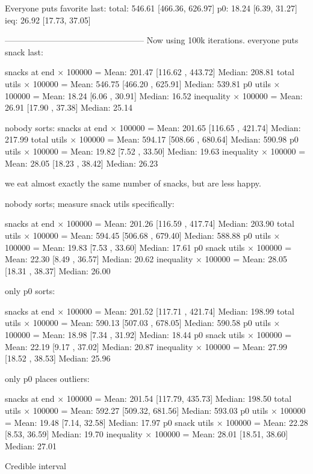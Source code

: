 \documentclass[twocolumn]{article}
\begin{document}
Everyone puts favorite last:
total: 546.61 [466.36, 626.97]
p0: 18.24 [6.39, 31.27]
ieq: 26.92 [17.73, 37.05]


--------------------------------------------------
Now using 100k iterations. everyone puts snack last:

snacks at end × 100000 = Mean: 201.47 [116.62 , 443.72] Median: 208.81
total utils × 100000 = Mean: 546.75 [466.20 , 625.91] Median: 539.81
p0 utils × 100000 = Mean: 18.24 [6.06 , 30.91] Median: 16.52
inequality × 100000 = Mean: 26.91 [17.90 , 37.38] Median: 25.14

nobody sorts:
snacks at end × 100000 = Mean: 201.65 [116.65 , 421.74] Median: 217.99
total utils × 100000 = Mean: 594.17 [508.66 , 680.64] Median: 590.98
p0 utils × 100000 = Mean: 19.82 [7.52 , 33.50] Median: 19.63
inequality × 100000 = Mean: 28.05 [18.23 , 38.42] Median: 26.23

we eat almost exactly the same number of snacks, but are less happy.


nobody sorts; measure snack utils specifically:

snacks at end × 100000 = Mean: 201.26 [116.59 , 417.74] Median: 203.90
total utils × 100000 = Mean: 594.45 [506.68 , 679.40] Median: 588.88
p0 utils × 100000 = Mean: 19.83 [7.53 , 33.60] Median: 17.61
p0 snack utils × 100000 = Mean: 22.30 [8.49 , 36.57] Median: 20.62
inequality × 100000 = Mean: 28.05 [18.31 , 38.37] Median: 26.00

only p0 sorts:

snacks at end × 100000 = Mean: 201.52 [117.71 , 421.74] Median: 198.99
total utils × 100000 = Mean: 590.13 [507.03 , 678.05] Median: 590.58
p0 utils × 100000 = Mean: 18.98 [7.34 , 31.92] Median: 18.44
p0 snack utils × 100000 = Mean: 22.19 [9.17 , 37.02] Median: 20.87
inequality × 100000 = Mean: 27.99 [18.52 , 38.53] Median: 25.96

only p0 places outliers:

snacks at end × 100000 = Mean: 201.54 [117.79, 435.73] Median: 198.50
total utils × 100000 = Mean: 592.27 [509.32, 681.56] Median: 593.03
p0 utils × 100000 = Mean: 19.48 [7.14, 32.58] Median: 17.97
p0 snack utils × 100000 = Mean: 22.28 [8.53, 36.59] Median: 19.70
inequality × 100000 = Mean: 28.01 [18.51, 38.60] Median: 27.01



Credible interval\cite{krushke2014doing}
\end{document}
